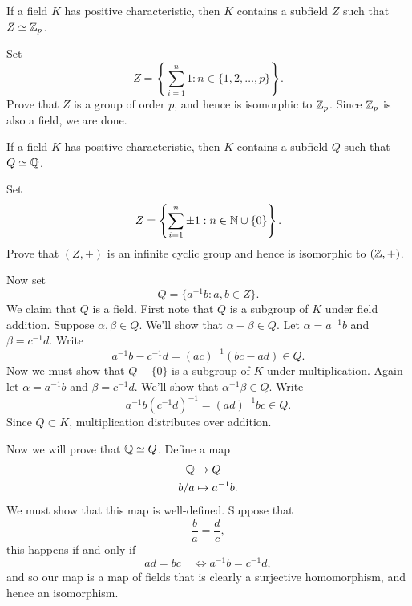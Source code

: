 \documentclass{ximera}
\begin{document}
\begin{theorem}
  If a field $K$ has positive characteristic, then $K$ contains a
  subfield $Z$ such that $Z\simeq \mathbb Z_p$.
  \begin{sketch}
    Set
    \[
    Z =\left\{\sum_{i=1}^n 1:n\in\{1,2,\dots,p\}\right\}.
    \]
    Prove that $Z$ is a group of order $p$, and hence is isomorphic to
    $\mathbb Z_p$. Since $\mathbb Z_p$ is also a field, we are done.
  \end{sketch}
\end{theorem}





\begin{theorem}
  If a field $K$ has positive characteristic, then $K$ contains a
  subfield $Q$ such that $Q\simeq \mathbb Q$.
  \begin{sketch}
    Set
    \[
    Z =\left\{\sum_{i=1}^n \pm 1:n\in \mathbb N\cup\{0\}\right\}.
    \]
    Prove that $(Z,+)$ is an infinite cyclic group and hence is
    isomorphic to $(\mathbb Z,+)$.

    Now set
    \[
    Q = \{a^{-1}b : a,b\in Z\}.
    \]
    We claim that $Q$ is a field. First note that $Q$ is a subgroup of
    $K$ under field addition. Suppose $\alpha,\beta\in Q$. We'll
    show that $\alpha-\beta\in Q$. Let $\alpha = a^{-1}b$ and $\beta=
    c^{-1}d$. Write
    \[
    a^{-1}b - c^{-1} d = (ac)^{-1}(bc- ad)\in Q.
    \]
    Now we must show that $Q-\{0\}$ is a subgroup of $K$ under
    multiplication. Again let $\alpha = a^{-1}b$ and $\beta=
    c^{-1}d$. We'll show that $\alpha^{-1}\beta \in Q$. Write
    \[
    a^{-1}b (c^{-1}d)^{-1} = (ad)^{-1} bc\in Q.
    \]
    Since $Q\subset K$, multiplication distributes over addition.

    Now we will prove that $\mathbb Q\simeq Q$. Define a map
    \begin{align*}
      \mathbb Q &\to Q\\
      b/a &\mapsto a^{-1} b.
    \end{align*}
    We must show that this map is well-defined.
    Suppose that
    \[
    \frac{b}{a} = \frac{d}{c},
    \]
    this happens if and only if
    \[
    ad = bc\quad\Leftrightarrow a^{-1} b = c^{-1} d,
    \]
    and so our map is a map of fields that is clearly a surjective
    homomorphism, and hence an isomorphism.
  \end{sketch}
\end{theorem}
\end{document}
